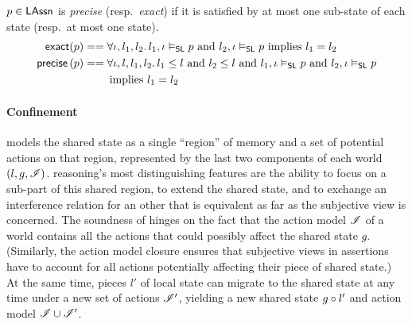 \begin{definition}
  $p\in\mathsf{LAssn}$ is \emph{precise} (resp.\ \emph{exact}) if it is
  satisfied by at most one sub-state of each state (resp.\ at most one
  state).
  \begin{align*}
    \textsf{exact}(p) &==
    \forall \iota, l_1, l_2.\, l_1, \iota \mathrel{\vDash_{\mathsf{SL}}} p\text{ and }l_2, \iota
    \mathrel{\vDash_{\mathsf{SL}}} p\text{ implies } l_1 = l_2\\
    \textsf{precise} \left( p \right) &==
    \forall \iota, l, l_1, l_2.\, l_1\leq l\text{ and }l_2\leq l\text{ and }l_1, \iota \mathrel{\vDash_{\mathsf{SL}}} p\text{ and }l_2, \iota
    \mathrel{\vDash_{\mathsf{SL}}} p\\
    &\qquad\text{ implies } l_1 = l_2
  \end{align*}
\end{definition}

\paragraph{Confinement}
\colosl models the shared state as a single ``region'' of memory and a
set of potential actions on that region, represented by the last two
components of each world $(l,g,\mathscr{I})$. \colosl reasoning's most
distinguishing features are the ability to focus on a sub-part of this
shared region, to extend the shared state, and to exchange an
interference relation for an other that is equivalent as far as the
subjective view is concerned. The soundness of \colosl hinges on the
fact that the action model $\mathscr{I}$ of a world contains all the actions
that could possibly affect the shared state $g$. (Similarly, the
action model closure ensures that subjective views in assertions have
to account for all actions potentially affecting their piece of shared
state.) At the same time, pieces $l'$ of local state can migrate to
the shared state at any time under a new set of actions $\mathscr{I}'$,
yielding a new shared state $g\circ l'$ and action model $\mathscr{I}
\cup \mathscr{I}'$.

